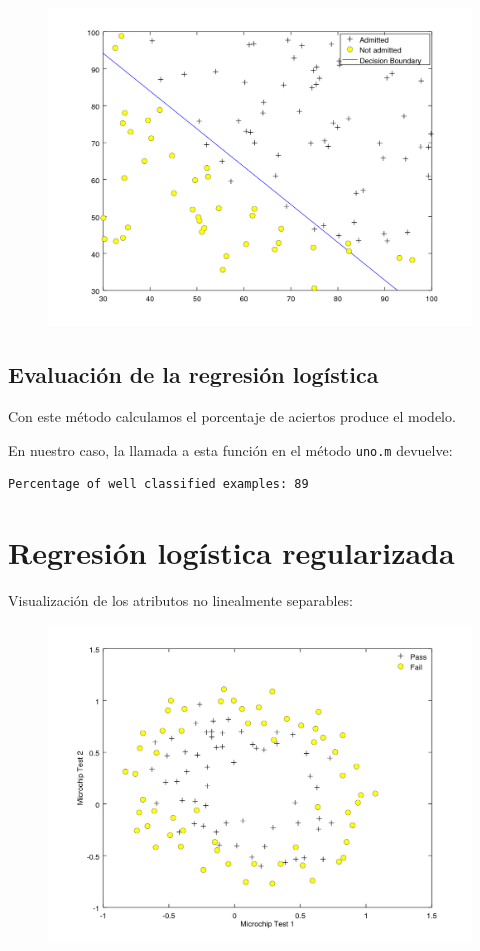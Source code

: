 \documentclass{article}
\begin{document}
\begin{figure}[h]
\centering
\includegraphics[width=\textwidth]{regresion1}
\label{fig:estudio}
\end{figure}

\subsection{Evaluación de la regresión logística}
Con este método calculamos el porcentaje de aciertos produce el modelo.

En nuestro caso, la llamada a esta función en el método {\tt uno.m} devuelve:
\begin{lstlisting}[style=snippet]
Percentage of well classified examples: 89
\end{lstlisting}

\pagebreak
\section{Regresión logística regularizada}
Visualización de los atributos no linealmente separables:
\begin{figure}[h]
\centering
\includegraphics[width=\textwidth]{examples2}
\label{fig:estudio}
\end{figure}
\end{document}
